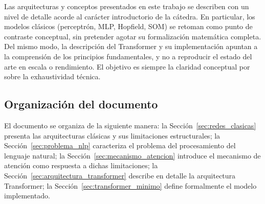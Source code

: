 Las arquitecturas y conceptos presentados en este trabajo se describen con
un nivel de detalle acorde al carácter introductorio de la cátedra. En
particular, los modelos clásicos (perceptrón, MLP, Hopfield, SOM) se
retoman como punto de contraste conceptual, sin pretender agotar su
formalización matemática completa. Del mismo modo, la descripción del
Transformer y su implementación apuntan a la comprensión de los principios
fundamentales, y no a reproducir el estado del arte en escala o rendimiento.
El objetivo es siempre la claridad conceptual por sobre la exhaustividad
técnica.

\subsection*{Organización del documento}

El documento se organiza de la siguiente manera:
la Sección~\ref{sec:redes_clasicas} presenta las arquitecturas clásicas y sus
limitaciones estructurales;
la Sección~\ref{sec:problema_nlp} caracteriza el problema del procesamiento del
lenguaje natural;
la Sección~\ref{sec:mecanismo_atencion} introduce el mecanismo de atención como
respuesta a dichas limitaciones;
la Sección~\ref{sec:arquitectura_transformer} describe en detalle la arquitectura
Transformer;
la Sección~\ref{sec:transformer_minimo} define formalmente el modelo implementado.
